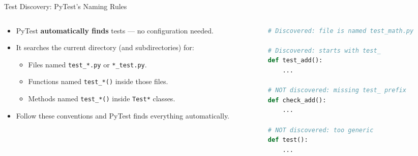 \begin{frame}{Test Discovery: PyTest's Naming Rules}
\setlength{\leftmargini}{0.5cm}
\begin{columns}[c,t,totalwidth=1.0\textwidth]
\begin{column}[c]{0.49\linewidth}
\begin{block}{}
\begin{itemize}
\item PyTest \textbf{automatically finds} tests --- no configuration needed.
\item It searches the current directory (and subdirectories) for:
\begin{itemize}
\item Files named \texttt{test\_*.py} or \texttt{*\_test.py}.
\item Functions named \texttt{test\_*()} inside those files.
\item Methods named \texttt{test\_*()} inside \texttt{Test*} classes.
\end{itemize}
\item Follow these conventions and PyTest finds everything automatically.
\end{itemize}
\end{block}
\end{column}
\begin{column}[c]{0.49\linewidth}
\begin{lstlisting}[style=fullwidth,language=python,numbers=none]
# Discovered: file is named test_math.py

# Discovered: starts with test_
def test_add():
    ...

# NOT discovered: missing test_ prefix
def check_add():
    ...

# NOT discovered: too generic
def test():
    ...
\end{lstlisting}
\end{column}
\end{columns}
\end{frame}

